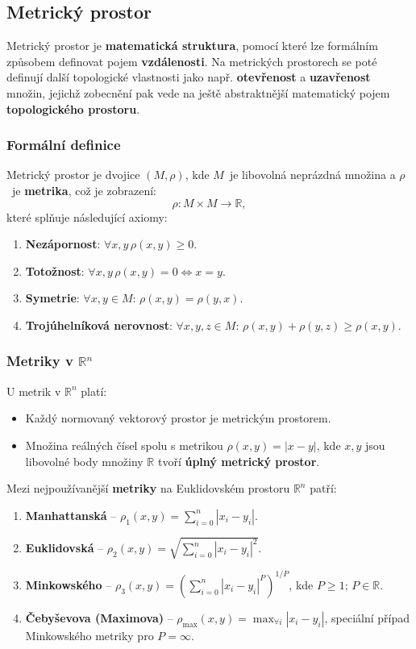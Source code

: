 \subsection{Metrický prostor}
Metrický prostor je \textbf{matematická struktura}, pomocí které lze formálním způsobem definovat pojem \textbf{vzdálenosti}. Na metrických prostorech se poté definují další topologické vlastnosti jako např. \textbf{otevřenost} a \textbf{uzavřenost} množin, jejichž zobecnění pak vede na ještě abstraktnější matematický pojem \textbf{topologického prostoru}.

\subsubsection{Formální definice}
Metrický prostor je dvojice $(M, \rho)$, kde $M$ je libovolná neprázdná množina a $\rho$ je \textbf{metrika}, což je zobrazení:
\begin{equation*}
\rho: M \times M \rightarrow \mathbb{R},
\end{equation*}
které splňuje následující axiomy:
\begin{enumerate}
\item \textbf{Nezápornost}: $\forall x, y \, \rho(x, y) \geq 0$.
\item \textbf{Totožnost}: $\forall x, y \, \rho (x, y)  = 0 \Leftrightarrow x = y$.
\item \textbf{Symetrie}: $\forall x, y \in M: \, \rho(x, y) = \rho(y,x)$.
\item \textbf{Trojúhelníková nerovnost}: $\forall x, y, z \in M: \, \rho(x, y) + \rho(y,z) \geq \rho(x, y)$.
\end{enumerate}

\subsubsection{Metriky v $\mathbb{R}^n$}
U metrik v $\mathbb{R}^n$ platí:
\begin{itemize}
\item Každý normovaný vektorový prostor je metrickým prostorem.
\item Množina reálných čísel spolu s metrikou $\rho(x, y) = |x - y|$, kde $x, y$ jsou libovolné body množiny $\mathbb{R}$ tvoří \textbf{úplný metrický prostor}.
\end{itemize}
Mezi nejpoužívanější \textbf{metriky} na Euklidovském prostoru $\mathbb{R}^n$ patří:
\begin{enumerate}
\item \textbf{Manhattanská} -- $\rho_1(x, y) = \sum_{i = 0}^n |x_i - y_i|$.
\item \textbf{Euklidovská} -- $\rho_2(x, y) = \sqrt{\sum_{i = 0}^n |x_i - y_i|^2}$.
\item \textbf{Minkowského} -- $\rho_3(x, y) = (\sum_{i = 0}^n |x_i - y_i|^P)^{1/P}$, kde $P \geq 1; \, P \in \mathbb{R}$.
\item \textbf{Čebyševova (Maximova)} -- $\rho_{\max}(x, y) = \max_{\forall i} |x_i - y_i|$, speciální případ Minkowského metriky pro $P = \infty$.
\end{enumerate}


